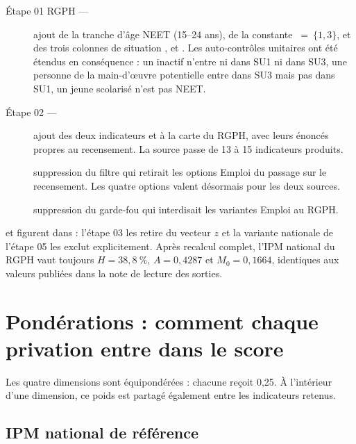 \documentclass[11pt,a4paper]{article}
\begin{document}
\begin{description}
  \item[Étape 01 RGPH --- ] ajout de la tranche d'âge
  NEET (15--24 ans), de la constante ~=~$\{1,3\}$, et des trois
  colonnes de situation ,  et
  \allowbreak{}. Les auto-contrôles unitaires ont été étendus en
  conséquence : un inactif n'entre ni dans SU1 ni dans SU3, une personne de la main-d'{\oe}uvre
  potentielle entre dans SU3 mais pas dans SU1, un jeune scolarisé n'est pas NEET.

  \item[Étape 02 --- ] ajout des deux indicateurs
   et  à la carte du RGPH, avec leurs énoncés propres au
  recensement. La source passe de 13 à 15 indicateurs produits.

  \item[] suppression du filtre qui retirait les options Emploi du passage
  sur le recensement. Les quatre options valent désormais pour les deux sources.

  \item[] suppression du garde-fou  qui
  interdisait les variantes Emploi au RGPH.
\end{description}

\begin{retenir}
 et  figurent dans  : l'étape 03
les retire du vecteur $z$ et la variante nationale de l'étape 05 les exclut explicitement. Après
recalcul complet, l'IPM national du RGPH vaut toujours $H = 38{,}8~\%$, $A = 0{,}4287$ et
$M_0 = 0{,}1664$, identiques aux valeurs publiées dans la note de lecture des sorties.
\end{retenir}

\section{Pondérations : comment chaque privation entre dans le score}

Les quatre dimensions sont équipondérées : chacune reçoit 0,25. À l'intérieur d'une dimension,
ce poids est partagé également entre les indicateurs retenus.

\subsection{IPM national de référence}
\end{document}
